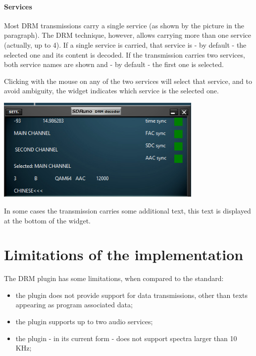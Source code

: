 \documentclass[10pt]{article}
\begin{document}
\paragraph{Services}

Most DRM transmissions carry a single service (as shown by the picture
in the paragraph).
The DRM technique, however, allows carrying more than one service (actually, up to 4). If a single service is carried, that service is - by default -
the selected one and its content is decoded.
If the transmission carries two services, both service names are shown
and - by default -  the first one is selected.
\par
Clicking with the mouse on any of the two services will select that service,
and to avoid ambiguity, the widget indicates which service is the selected one.

\includegraphics[width=100mm]{drm-two-services.png}

In some cases the transmission carries some additional text, this text is
displayed at the bottom of the widget.
\section{Limitations of the implementation}
The DRM plugin has some limitations, when compared to the standard:
\begin{itemize}
\item the plugin does not provide support for data transmissions, other than
texts appearing as program associated data;
\item the plugin supports up to two audio services;
\item the plugin - in its current form - does not support spectra larger
than 10 KHz;
\end{itemize}
\end{document}
